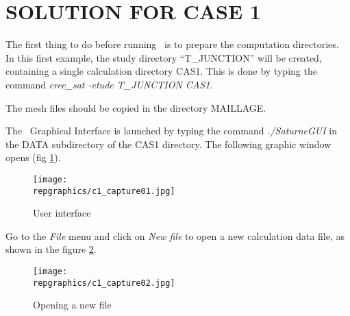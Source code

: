 %
%
%
%
%
%
%
\section{SOLUTION FOR CASE 1}
The first thing to do before running \CS\ is to prepare the computation
directories. In this first example, the study directory ``T\_JUNCTION'' will be
created, containing a single calculation directory CAS1. This is done by typing
the command {\itshape cree\_sat -etude T\_JUNCTION CAS1}.

The mesh files should be copied in the directory MAILLAGE.

The \CS\ Graphical Interface is launched by typing the command
{\itshape ./SaturneGUI} in the DATA subdirectory of the CAS1 directory.
The following graphic window opens (fig \ref{fig1_e1}).

\begin{figure}[ht]
\begin{center}
\texttt{[image: \\repgraphics/c1\_capture01.jpg]}
\caption{User interface}
\label{fig1_e1}
\end{center}
\end{figure}


\clearpage
Go to the {\itshape File} menu and click on {\itshape New file} to open a new
calculation data file, as shown in the figure
\ref{fig2_e1}.

\begin{figure}[ht]
\begin{center}
\texttt{[image: \\repgraphics/c1\_capture02.jpg]}
\caption{Opening a new file}
\label{fig2_e1}
\end{center}
\end{figure}



